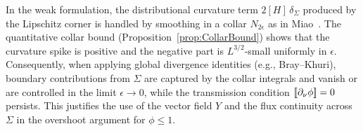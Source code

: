 \begin{remark}\label{rem:CornerMeasure}
In the weak formulation, the distributional curvature term $2[H]\,\delta_\Sigma$ produced by the Lipschitz corner is handled by smoothing in a collar $N_{2\epsilon}$ as in Miao~\cite{miao2002}. The quantitative collar bound (Proposition~\ref{prop:CollarBound}) shows that the curvature spike is positive and the negative part is $L^{3/2}$-small uniformly in $\epsilon$. Consequently, when applying global divergence identities (e.g., Bray--Khuri), boundary contributions from $\Sigma$ are captured by the collar integrals and vanish or are controlled in the limit $\epsilon\to 0$, while the transmission condition $[\![ \partial_\nu \phi ]\!]=0$ persists. This justifies the use of the vector field $Y$ and the flux continuity across $\Sigma$ in the overshoot argument for $\phi\le 1$.
\end{remark}
